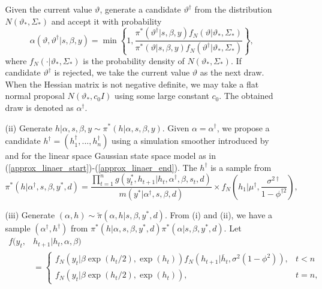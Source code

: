 \begin{itemize}
\begin{itemize}
        Given the current value $\vartheta$, generate a candidate $\vartheta^\dag$ from the distribution $N(\vartheta_*, \Sigma_*)$ and accept it with probability
        \begin{equation*}
        \alpha(\vartheta, \vartheta^\dag|s,\beta, y) = \min \left\{1, \frac{\pi^*(\vartheta^\dag|s, \beta, y) f_N(\vartheta|\vartheta_*, \Sigma_*)}{\pi^*(\vartheta|s, \beta,y) f_N(\vartheta^\dag|\vartheta_*, \Sigma_*)} \right\},
        \end{equation*}
        where $f_N(\cdot|\vartheta_*, \Sigma_*)$ is the probability density of $N(\vartheta_*, \Sigma_*)$. 
        If candidate $\vartheta^\dag$ is rejected, we take the current value $\vartheta$ as the next draw. When the Hessian matrix is not negative definite, we may take a flat normal proposal $N(\vartheta_*, c_0 I)$ using some large constant $c_0$. The obtained draw is denoted as $\alpha^\dag$.
        \item[(ii)] Generate $h|\alpha, s, \beta, y \sim \pi^*(h|\alpha, s, \beta, y)$. Given $\alpha=\alpha^\dag$, we propose a candidate $h^\dag = (h_1^\dag, ..., h_n^\dag)$ using a simulation smoother introduced by \cite{DeShephard(95)} and \cite{DurbinKoopman(02)} for the linear space Gaussian state space model as in (\ref{approx_linaer_start})-(\ref{approx_linaer_end}).
        The $h^\dag$ is a sample from
               \begin{equation*}
            \pi^*(h|\alpha^{\dagger}, s, \beta, y^*, d) = \frac{\prod_{t=1}^n g(y_t^*, h_{t+1}| h_t, \alpha^{\dagger},\beta, s_t, d)}{m(y^*|\alpha^{\dagger}, s,\beta,d)} \times f_N \left( h_1 \bigg| \mu^{\dagger}, \frac{\sigma^{2\dagger}}{1-\phi^{\dagger 2}} \right),
        \end{equation*}
        \item[(iii)] Generate $(\alpha,h)\sim \tilde{\pi}(\alpha,h|s,\beta,y^*,d)$. From (i) and (ii), we have a sample $(\alpha^\dagger,h^\dag)$ from $\pi^*(h|\alpha, s,\beta, y^*,d)\pi^*(\alpha|s,\beta,y^*,d).$
        Let
        \begin{align*}
            f(y_t, &h_{t+1}|h_t, \alpha,\beta) \\
            &= 
            \begin{cases}
                f_N(y_t| \beta \exp(h_t/2), \exp(h_t)) f_N(h_{t+1}| \overline{h}_t, \sigma^2(1-\phi^2)), & t < n \\
                f_N(y_t| \beta \exp(h_t/2), \exp(h_t)), & t = n,
            \end{cases} \\

\end{align*}
\end{itemize}
\end{itemize}

